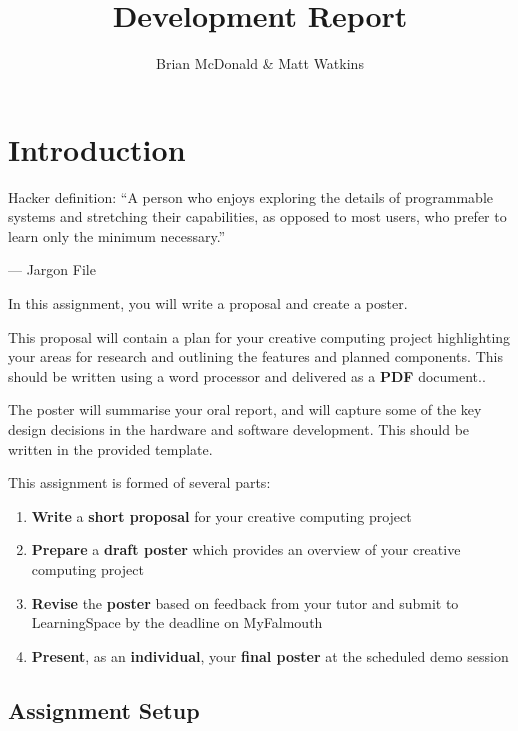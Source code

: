 \documentclass{../../fal_assignment}
\title{Development Report}
\author{Brian McDonald \& Matt Watkins}
\begin{document}
\maketitle

\section*{Introduction}

\begin{marginquote}
Hacker definition: ``A person who enjoys exploring the details of programmable systems and stretching their capabilities, as opposed to most users, who prefer to learn only the minimum necessary.''

--- Jargon File

\end{marginquote}

In this assignment, you will write a proposal and create a poster. 

This proposal will contain a plan for your creative computing project highlighting your areas for research and outlining the features and planned components.	This should be written using a word processor and delivered as a \textbf{PDF} document..

The poster will summarise your oral report, and will capture some of the key design decisions in the 
hardware and software development. This should be written in the provided template.

This assignment is formed of several parts:

\begin{enumerate}[label=(\Alph*)]
    \item \textbf{Write} a \textbf{short proposal} for your creative computing project
	\item \textbf{Prepare} a \textbf{draft poster} which provides an overview of your creative computing project
	\item \textbf{Revise} the \textbf{poster} based on feedback from your tutor and submit to LearningSpace by the deadline on MyFalmouth
	\item \textbf{Present}, as an \textbf{individual}, your \textbf{final poster} at the scheduled demo session
\end{enumerate}


	\subsection*{Assignment Setup}
	
\end{document}
